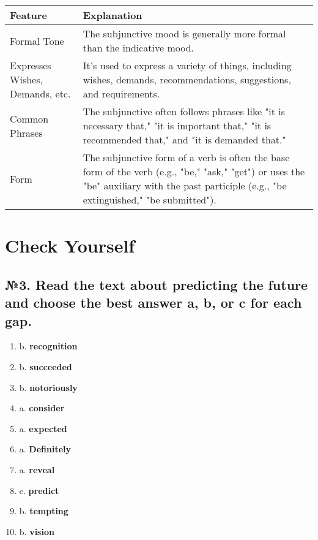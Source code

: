 \begin{tabular}{|l|p{10cm}|}
      \hline
      \textbf{Feature}                & \textbf{Explanation}                                                                                                                                                                        \\ \hline
      Formal Tone                     & The subjunctive mood is generally more formal than the indicative mood.                                                                                                                     \\ \hline
      Expresses Wishes, Demands, etc. & It's used to express a variety of things, including wishes, demands, recommendations, suggestions, and requirements.                                                                        \\ \hline
      Common Phrases                  & The subjunctive often follows phrases like "it is necessary that," "it is important that," "it is recommended that," and "it is demanded that."                                             \\ \hline
      Form                            & The subjunctive form of a verb is often the base form of the verb (e.g., "be," "ask," "get") or uses the "be" auxiliary with the past participle (e.g., "be extinguished," "be submitted"). \\ \hline
\end{tabular}

\section{Check Yourself}

\subsection*{№3. Read the text about predicting the future and choose the best answer a, b, or c for each gap.}

\begin{enumerate}
      \item b. \textbf{recognition}
      \item b. \textbf{succeeded}
      \item b. \textbf{notoriously}
      \item a. \textbf{consider}
      \item a. \textbf{expected}
      \item a. \textbf{Definitely}
      \item a. \textbf{reveal}
      \item c. \textbf{predict}
      \item b. \textbf{tempting}
      \item b. \textbf{vision}
\end{enumerate}

